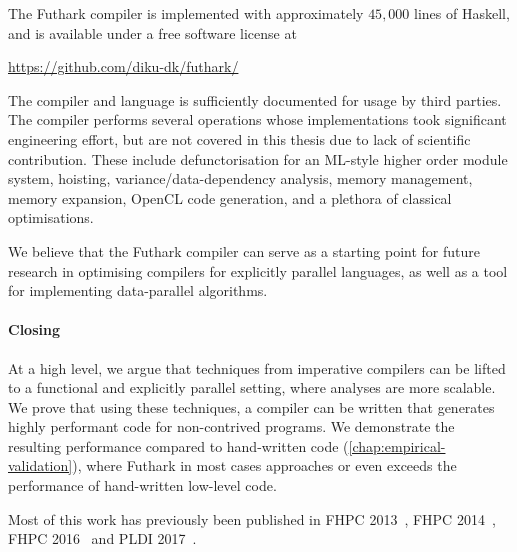 The Futhark compiler is implemented with approximately $45,000$ lines
of Haskell, and is available under a free software license at

\centerline{\url{https://github.com/diku-dk/futhark/}}

The compiler and language is sufficiently documented for usage by
third parties.  The compiler performs several operations whose
implementations took significant engineering effort, but are not
covered in this thesis due to lack of scientific contribution.  These
include defunctorisation for an ML-style higher order module system,
hoisting, variance/data-dependency analysis, memory management, memory
expansion, OpenCL code generation, and a plethora of classical
optimisations.

We believe that the Futhark compiler can serve as a starting point for
future research in optimising compilers for explicitly parallel
languages, as well as a tool for implementing data-parallel
algorithms.

\paragraph{Closing}

At a high level, we argue that techniques from imperative compilers
can be lifted to a functional and explicitly parallel setting, where
analyses are more scalable.  We prove that using these techniques, a
compiler can be written that generates highly performant code for
non-contrived programs.  We demonstrate the resulting performance
compared to hand-written code (\cref{chap:empirical-validation}),
where Futhark in most cases approaches or even exceeds the performance
of hand-written low-level code.

Most of this work has previously been published in FHPC
2013~\cite{henriksen2013t2}, FHPC 2014~\cite{henriksen2014size}, FHPC
2016~\cite{Futhark:redomap,} and PLDI
2017~\cite{henriksen2017futhark}.

